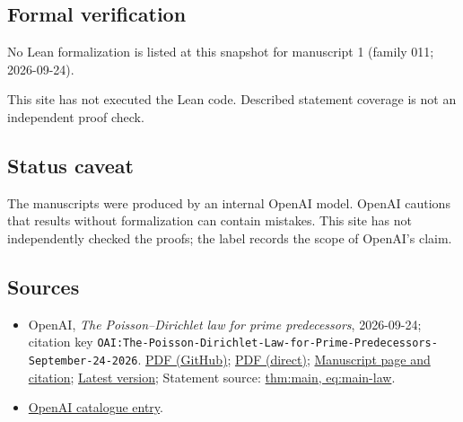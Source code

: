 \documentclass[11pt]{article}
\begin{document}
\subsection{Formal verification}
No Lean formalization is listed at this snapshot for manuscript 1 (family 011; 2026-09-24).

This site has not executed the Lean code. Described statement coverage is not an independent proof check.

\subsection{Status caveat}
The manuscripts were produced by an internal OpenAI model. OpenAI cautions that results without formalization can contain mistakes. This site has not independently checked the proofs; the label records the scope of OpenAI's claim.

\subsection{Sources}
\begin{itemize}
\item OpenAI, \emph{The Poisson–Dirichlet law for prime predecessors}, 2026-09-24; citation key \texttt{OAI:The-Poisson-Dirichlet-Law-for-Prime-Predecessors-September-24-2026}. \href{https://github.com/openai/math/blob/adc7f1241b42e322a6451854ab7e4b4c146bf78a/preprints/The-Poisson-Dirichlet-Law-for-Prime-Predecessors-September-24-2026/paper.pdf}{PDF (GitHub)}; \href{https://github.com/openai/math/raw/adc7f1241b42e322a6451854ab7e4b4c146bf78a/preprints/The-Poisson-Dirichlet-Law-for-Prime-Predecessors-September-24-2026/paper.pdf}{PDF (direct)}; \href{https://github.com/openai/math/blob/adc7f1241b42e322a6451854ab7e4b4c146bf78a/preprints/The-Poisson-Dirichlet-Law-for-Prime-Predecessors-September-24-2026/README.md}{Manuscript page and citation}; \href{https://github.com/openai/math/blob/main/preprints/The-Poisson-Dirichlet-Law-for-Prime-Predecessors-September-24-2026/paper.pdf}{Latest version}; Statement source: \href{https://github.com/openai/math/blob/adc7f1241b42e322a6451854ab7e4b4c146bf78a/preprints/The-Poisson-Dirichlet-Law-for-Prime-Predecessors-September-24-2026/build/sections/01-introduction.tex\#L30}{thm:main, eq:main-law}.
\item \href{https://github.com/openai/math/blob/adc7f1241b42e322a6451854ab7e4b4c146bf78a/CONTENTS.md}{OpenAI catalogue entry}.
\end{itemize}
\end{document}

